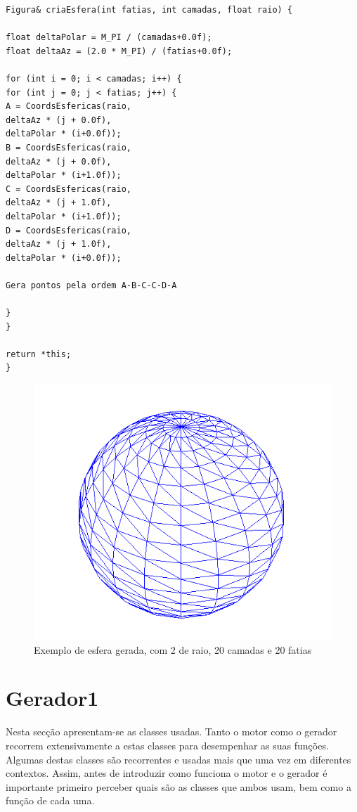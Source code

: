 \begin{Verbatim}
Figura& criaEsfera(int fatias, int camadas, float raio) {

float deltaPolar = M_PI / (camadas+0.0f);
float deltaAz = (2.0 * M_PI) / (fatias+0.0f);

for (int i = 0; i < camadas; i++) {
for (int j = 0; j < fatias; j++) {
A = CoordsEsfericas(raio, 
deltaAz * (j + 0.0f), 
deltaPolar * (i+0.0f));
B = CoordsEsfericas(raio,
deltaAz * (j + 0.0f), 
deltaPolar * (i+1.0f));
C = CoordsEsfericas(raio,
deltaAz * (j + 1.0f),
deltaPolar * (i+1.0f));
D = CoordsEsfericas(raio,
deltaAz * (j + 1.0f),
deltaPolar * (i+0.0f));

Gera pontos pela ordem A-B-C-C-D-A

}
}

return *this;
}
\end{Verbatim}

\begin{figure}[<+htpb+>]
	\centering
	\includegraphics[scale=0.5]{imagens/p3_esfera_2_20_20.png}
	\caption{Exemplo de esfera gerada, com 2 de raio, 20 camadas e 20 fatias}
	\label{p1:fig:p3_esfera_2_20_20}
\end{figure}




\chapter{Gerador1}
\label{cap:p1}

Nesta secção apresentam-se as classes usadas. Tanto o motor como o gerador recorrem extensivamente a estas classes para desempenhar as suas funções. Algumas destas classes são recorrentes e usadas mais que uma vez em diferentes contextos. Assim, antes de introduzir como funciona o motor e o gerador é importante primeiro perceber quais são as classes que ambos usam, bem como a função de cada uma.

